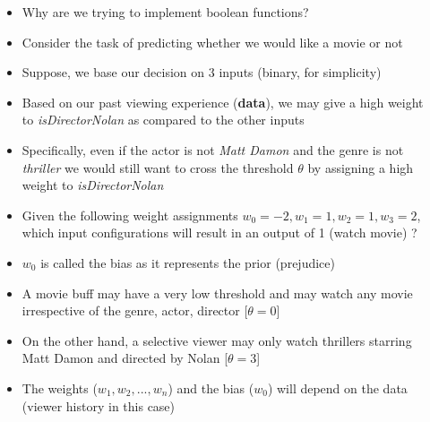 \begin{frame}
	\begin{columns}
		\begin{overlayarea}{\textwidth}{\textheight}
			\begin{center}
				
			\end{center}

		\end{overlayarea}

		\begin{overlayarea}{\textwidth}{\textheight}
				\begin{itemize}\justifying
					\item<1-> Why are we trying to implement boolean functions?
					\item<2-> Consider the task of predicting whether we would like a movie or not
					\item<3-> Suppose, we base our decision on 3 inputs (binary, for simplicity)
					\item<4-> Based on our past viewing experience (\textbf{data}), we may give a high weight to \textit{isDirectorNolan} as compared to the other inputs
					\item<5-> Specifically, even if the actor is not \textit{Matt Damon} and the genre is not \textit{thriller} we would still want to cross the threshold $\theta$ by assigning a high weight to \textit{isDirectorNolan}
					\item<6-> Given the following weight assignments $w_0=-2, w_1=1, w_2=1, w_3=2$, which input configurations will result in an output of 1 (watch movie) ? \onslide<6->{[001, 011, 101, 111, 110]}
				\end{itemize}

				\begin{itemize}\justifying
					\item<7-> $w_0$ is called the bias as it represents the prior (prejudice)
					\item<8-> A movie buff may have a very low threshold and may watch any movie irrespective of the genre, actor, director [$\theta = 0$]
					\item<9-> On the other hand, a selective viewer may only watch thrillers starring Matt Damon and directed by Nolan [$\theta = 3$]
					\item<10-> The weights ($w_1, w_2, ..., w_n$) and the bias ($w_0$) will depend on the data (viewer history in this case)
				\end{itemize}
		\end{overlayarea}
	\end{columns}
\end{frame}

